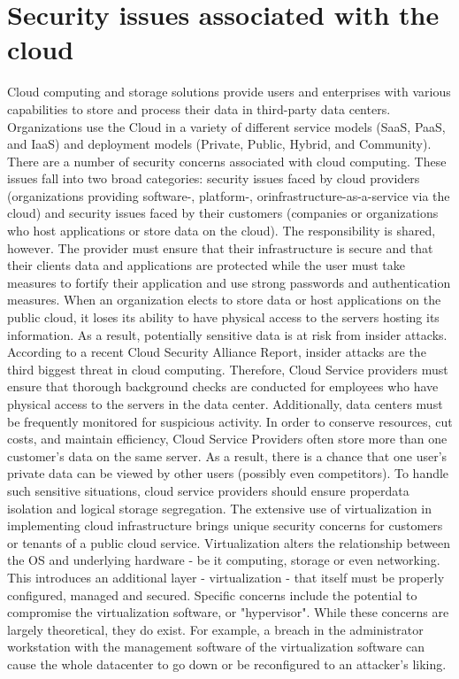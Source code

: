 \documentclass[11pt,a4paper]{report}
\begin{document}
\section{Security issues associated with the cloud}
Cloud computing and storage solutions provide users and enterprises with various capabilities to store and process their data in third-party data centers.
Organizations use the Cloud in a variety of different service models (SaaS, PaaS, and IaaS) and deployment models (Private, Public, Hybrid, and Community).
There are a number of security concerns associated with cloud computing.
These issues fall into two broad categories: security issues faced by cloud providers (organizations providing software-, platform-, orinfrastructure-as-a-service via the cloud) and security issues faced by their customers (companies or organizations who host applications or store data on the cloud).
The responsibility is shared, however. The provider must ensure that their infrastructure is secure and that their clients data and applications are protected while the user must take measures to fortify their application and use strong passwords and authentication measures.
When an organization elects to store data or host applications on the public cloud, it loses its ability to have physical access to the servers hosting its information. 
As a result, potentially sensitive data is at risk from insider attacks.
According to a recent Cloud Security Alliance Report, insider attacks are the third biggest threat in cloud computing.
Therefore, Cloud Service providers must ensure that thorough background checks are conducted for employees who have physical access to the servers in the data center.
Additionally, data centers must be frequently monitored for suspicious activity.
In order to conserve resources, cut costs, and maintain efficiency, Cloud Service Providers often store more than one customer's data on the same server.
As a result, there is a chance that one user's private data can be viewed by other users (possibly even competitors).
To handle such sensitive situations, cloud service providers should ensure properdata isolation and logical storage segregation.
The extensive use of virtualization in implementing cloud infrastructure brings unique security concerns for customers or tenants of a public cloud service. Virtualization alters the relationship between the OS and underlying hardware - be it computing, storage or even networking. This introduces an additional layer - virtualization - that itself must be properly configured, managed and secured.
Specific concerns include the potential to compromise the virtualization software, or "hypervisor". While these concerns are largely theoretical, they do exist.
For example, a breach in the administrator workstation with the management software of the virtualization software can cause the whole datacenter to go down or be reconfigured to an attacker's liking.
\end{document}
